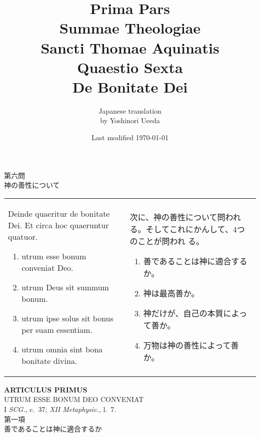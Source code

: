 \documentclass[10pt]{jsarticle} %
\title{{\bf Prima Pars}\\{\HUGE Summae Theologiae}\\Sancti Thomae
Aquinatis\\Quaestio Sexta\\{\bf De Bonitate Dei}}
\author{Japanese translation\\by Yoshinori {\sc Ueeda}}
\date{Last modified \today}
\begin{document}
\maketitle

\begin{center}
 {\Large 第六問\\神の善性について}
\end{center}

\begin{longtable}{p{21em}p{21em}}

Deinde quaeritur de bonitate Dei. Et circa hoc quaeruntur quatuor. 
\begin{enumerate}
 \item utrum esse bonum conveniat Deo.
 \item utrum Deus sit summum bonum.
 \item utrum ipse solus sit bonus per suam essentiam.
 \item utrum omnia sint bona bonitate divina.
\end{enumerate}
&

次に、神の善性について問われる。そしてこれにかんして、4つのことが問われ
 る。
\begin{enumerate}
 \item 善であることは神に適合するか。
 \item 神は最高善か。
 \item 神だけが、自己の本質によって善か。
 \item 万物は神の善性によって善か。
\end{enumerate}
\end{longtable}

\newpage
{}

\begin{center}
 {\Large {\bf ARTICULUS PRIMUS}}\\
 {\large UTRUM ESSE BONUM DEO CONVENIAT}\\
 {\footnotesize I {\itshape SCG.}, c.~37; {\itshape XII Metaphysic.}, l.~7.}\\
 {\Large 第一項\\善であることは神に適合するか}
\end{center}
\end{document}
